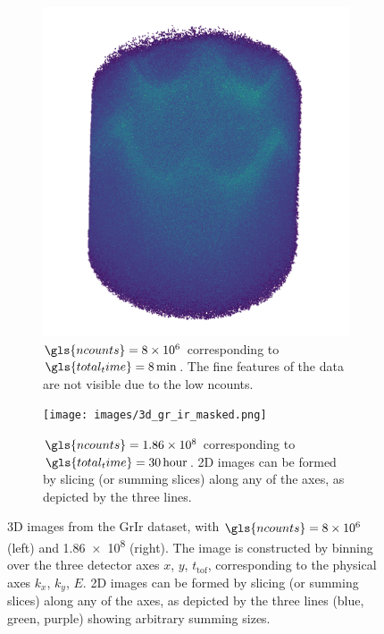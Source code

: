 \begin{figure}
    \centering
    \begin{subfigure}[t]{0.49\linewidth}
        \centering
        \includegraphics[width=1\linewidth]{images/3d_gr_ir_8M.png}
        \caption{$\gls{ncounts}=\num{8e6}$ corresponding to $\gls{total_time}=\qty{8}{min}$. The fine features of the data are not visible due to the low \gls{ncounts}.}
        \label{fig:3d-gr-ir-8M}
    \end{subfigure}
    \hfill
    \begin{subfigure}[t]{0.49\linewidth}
        \centering
        \texttt{[image: images/3d\_gr\_ir\_masked.png]}
        \caption{$\gls{ncounts}=\num{1.86e8}$ corresponding to $\gls{total_time}=\qty{30}{hour}$. 2D images can be formed by slicing (or summing slices) along any of the axes, as depicted by the three lines.}
        \label{fig:3d-gr-ir-186M}
    \end{subfigure}
    \caption{3D images from the \gls{GrIr} dataset, with $\gls{ncounts}=\num{8e6}$ (left)  and \num{1.86e8} (right). The image is constructed by binning over the three detector axes $x$, $y$, $t_{\text{tof}}$, corresponding to the physical axes $k_x$, $k_y$, $E$. 2D images can be formed by slicing (or summing slices) along any of the axes, as depicted by the three lines (blue, green, purple) showing arbitrary summing sizes.}
    \label{fig:3d-gr-ir}
\end{figure}


